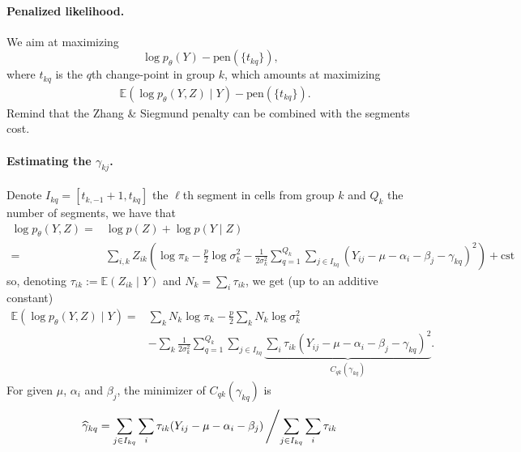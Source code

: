 \documentclass[a4paper, 11pt]{article}
\newcommand{\cst}{\text{cst}}
\newcommand{\Esp}{\mathbb{E}}
\begin{document}
\paragraph{Penalized likelihood.}
We aim at maximizing
$$
\log p_\theta(Y) - \text{pen}(\{t_{kq}\}),
$$
where $t_{kq}$ is the $q$th change-point in group $k$, which amounts at maximizing
\begin{align*}
 & \Esp \left(\log p_\theta(Y, Z)  \mid Y\right) - \text{pen}(\{t_{kq}\}).
\end{align*}
Remind that the Zhang \& Siegmund penalty can be combined with the segments cost.

\paragraph{Estimating the $\gamma_{kj}$.} Denote $I_{kq} = [t_{k, -1}+1, t_{kq}]$ the $\ell$th segment in cells from group $k$ and $Q_k$ the number of segments, we have that
\begin{align*}
  \log p_\theta(Y, Z)
  = & \log p(Z) + \log p(Y \mid Z) \\
  = & \sum_{i, k} Z_{ik} \left(\log \pi_k - \frac{p}2 \log \sigma_k^2 - \frac1{2\sigma_k^2} \sum_{q=1}^{Q_k} \sum_{j \in I_{kq}} (Y_{ij} - \mu - \alpha_i - \beta_j - \gamma_{kq})^2 \right) + \cst
\end{align*}
so, denoting $\tau_{ik} := \Esp(Z_{ik} \mid Y)$ and $N_k = \sum_{i} \tau_{ik}$, we get (up to an additive constant)
\begin{align*}
  \Esp( \log p_\theta(Y, Z) \mid Y )
  = & \sum_k N_k \log \pi_k 
  - \frac{p}2 \sum_k N_k \log \sigma_k^2 \\
  & - \sum_k \frac1{2\sigma_k^2} \sum_{q=1}^{Q_k} \sum_{j \in I_{kq}} \underset{C_{qk}(\gamma_{kq})}{\underbrace{\sum_i \tau_{ik} (Y_{ij} - \mu - \alpha_i - \beta_j - \gamma_{kq})^2}}. 
\end{align*}
For given $\mu$, $\alpha_i$ and $\beta_j$, the minimizer of $C_{qk}(\gamma_{kq})$
is
$$
\widehat{\gamma}_{kq} = \sum_{j \in I_{kq}} \sum_i \tau_{ik} (Y_{ij} - \mu - \alpha_i - \beta_j)
\left/ \sum_{j \in I_{kq}} \sum_i \tau_{ik}  \right.
$$
\end{document}
